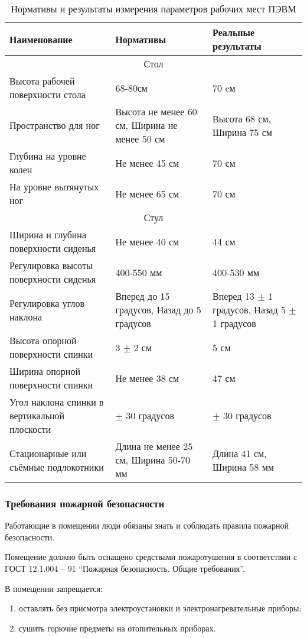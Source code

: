 \begin{longtable}[h!]{|*3{m{}|}}
\caption{Нормативы и результаты измерения параметров рабочих мест ПЭВМ}
\label{tab:bzd}
\\ \hline
Наименование & Нормативы & Реальные результаты \\ \hline
\multicolumn{3}{|c|}{Стол} \\ \hline
Высота рабочей поверхности стола & 68-80см & 70 cм \\ \hline
Пространство для ног & Высота не менее 60 см, Ширина не менее 50 см & Высота 68 см, Ширина 75 см \\ \hline
Глубина на уровне колен & Не менее 45 см & 70 см \\ \hline
На уровне вытянутых ног & Не менее 65 см & 70 см \\ \hline
\multicolumn{3}{|c|}{Стул} \\ \hline
Ширина и глубина поверхности сиденья & Не менее 40 см & 44 см \\ \hline
Регулировка высоты поверхности сиденья & 400-550 мм & 400-530 мм \\ \hline
Регулировка углов наклона & Вперед до 15 градусов,  Назад до 5 градусов & Вперед 13 $\pm$ 1 градусов, Назад 5 $\pm$ 1 градусов \\ \hline
Высота опорной поверхности спинки & 3 $\pm$ 2 см & 5 см \\ \hline
Ширина опорной поверхности спинки & Не менее 38 см & 47 см \\ \hline
Угол наклона спинки в вертикальной плоскости & $\pm$ 30 градусов & $\pm$ 30 градусов \\ \hline
Стационарные или съёмные подлокотники & Длина не менее 25 см, Ширина 50-70 мм & Длина 41 см, Ширина 58 мм \\ \hline
\end{longtable}

\subsubsection{Требования пожарной безопасности}
Работающие в помещении люди обязаны знать и соблюдать правила пожарной безопасности.

Помещение должно быть оснащено средствами пожаротушения в соответствии с ГОСТ 12.1.004 – 91 ``Пожарная безопасность. Общие требования''.

В помещении запрещается:
\begin{enumerate}
\item оставлять без присмотра электроустановки и электронагревательные приборы;
\item сушить горючие предметы на отопительных приборах.
\end{enumerate}

